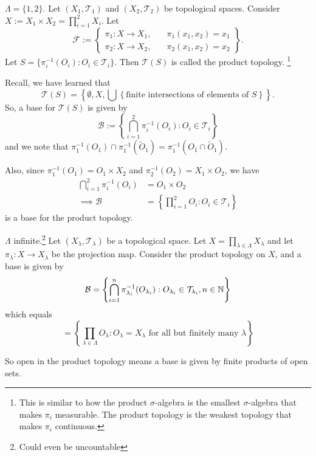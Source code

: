 \begin{exmp}
    $\Lambda = \{ 1, 2 \}$. Let $(X_1, \mathcal{T}_1)$ and $(X_2, \mathcal{T}_2)$ be topological spaces. 
    Consider $X := X_1 \times X_2 = \prod_{i = 1}^2 X_i$.
    Let 
    \[
        \mathcal{F} := \left\{
            \begin{aligned}
                \pi_1 : X \to X_1, \quad & \pi_1(x_1, x_2) = x_1 \\
                \pi_2 : X \to X_2, \quad & \pi_2(x_1, x_2) = x_2
            \end{aligned}
        \right\}.
    \] 
    Let $S = \{ \pi_i^{-1}(O_i) : O_i \in \mathcal{T}_i \}$. 
    Then $\mathcal{T}(S)$ is called the product topology.
    \footnote{This is similar to how the product $\sigma$-algebra is the smallest $\sigma$-algebra 
    that makes $\pi_i$ measurable. The product topology is the weakest topology that makes $\pi_i$ 
    continuous.}

    Recall, we have learned that 
    \[
        \mathcal{T}(S) = \left\{ \emptyset, X, \bigcup \left\{ \text{finite intersections of elements of } S \right\}  \right\}.
    \]
    So, a base for $\mathcal{T}(S)$ is given by 
    \[
        \mathcal{B} := \left\{ \bigcap_{i = 1}^2 \pi_i^{-1}(O_i) : O_i \in \mathcal{T}_i \right\} 
    \]
    and we note that $\pi_1^{-1}(O_1) \cap \pi_1^{-1}(\tilde{O}_1) = \pi_1^{-1}(O_1 \cap \tilde{O}_1)$.

    Also, since $\pi_1^{-1}(O_1) = O_1 \times X_2$ and $\pi_2^{-1}(O_2) = X_1 \times O_2$, we have
    \begin{align*}
        \bigcap_{i =1}^2 \pi_i^{-1}(O_i) &= O_1 \times O_2 \\
        \implies \mathcal{B} &= \left\{ \prod_{i=1}^2 O_i : O_i \in \mathcal{T}_i \right\}
    \end{align*}
    is a base for the product topology.
\end{exmp}
\begin{exmp}
    $\Lambda$ infinite.\footnote{Could even be uncountable} Let $(X_\lambda, \mathcal{T}_\lambda)$ 
    be a topological space. Let $X = \prod_{\lambda \in \Lambda} X_\lambda$ and let $
    \pi_\lambda : X \to X_\lambda$ be the projection map. Consider the product topology on $X$,
    and a base is given by
    \[
        \mathcal{B} = \left\{ \bigcap_{i = 1}^n \pi_{\lambda_i}^{-1} (O_{\lambda_i}) :
        O_{\lambda_i} \in \mathcal{T}_{\lambda_i}, n \in \mathbb{N} \right\}
    \]  
    which equals
    \[
        = \left\{ \prod_{\lambda \in \Lambda} O_\lambda : O_\lambda = X_\lambda \text{ for all but
        finitely many } \lambda \right\} 
    \]   

    So open in the product topology means a base is given by finite products of open sets.
\end{exmp}

